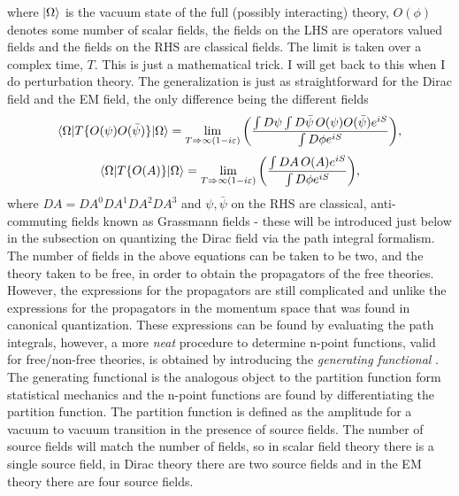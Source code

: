 where $\ket{\Omega}$ is the vacuum state of the full (possibly interacting) theory, $O(\phi)$ denotes some number of scalar fields, the fields on the LHS are operators valued fields and the fields on the RHS are classical fields. The limit is taken over a complex time, $T$. This is just a mathematical trick. I will get back to this when I do perturbation theory. The generalization is just as straightforward for the Dirac field and the EM field, the only difference being the different fields
\begin{equation}
	\braket{\Omega|T\{O(\psi)O(\bar{\psi})\}|\Omega}=\lim\limits_{T\Rightarrow \infty(1-i\varepsilon)}\bigg(\frac{\int D\psi\int D\bar{\psi}\,O(\psi)O(\bar{\psi}) e^{iS}}{\int D\phi e^{iS}}\bigg),
\end{equation} 
\begin{equation}
	\braket{\Omega|T\{O(A)\}|\Omega}=\lim\limits_{T\Rightarrow \infty(1-i\varepsilon)}\bigg(\frac{\int DA\,O(A) e^{iS}}{\int D\phi e^{iS}}\bigg),
\end{equation} 
where $DA=DA^0DA^1DA^2DA^3$ and $\psi,\bar{\psi}$ on the RHS are classical, anti-commuting fields known as Grassmann fields - these will be introduced just below in the subsection on quantizing the Dirac field via the path integral formalism. The number of fields in the above equations can be taken to be two, and the theory taken to be free, in order to obtain the propagators of the free theories. However, the expressions for the propagators are still complicated and unlike the expressions for the propagators in the momentum space that was found in canonical quantization. These expressions can be found by evaluating the path integrals, however, a more \emph{neat} procedure to determine n-point functions, valid for free/non-free theories, is obtained by introducing the \emph{generating functional} . The generating functional is the analogous object to the partition function form statistical mechanics and the n-point functions are found by differentiating the partition function. The partition function is defined as the amplitude for a vacuum to vacuum  transition in the presence of source fields. The number of source fields will match the number of fields, so in scalar field theory there is a single source field, in Dirac theory there are two source fields and in the EM theory there are four source fields.

